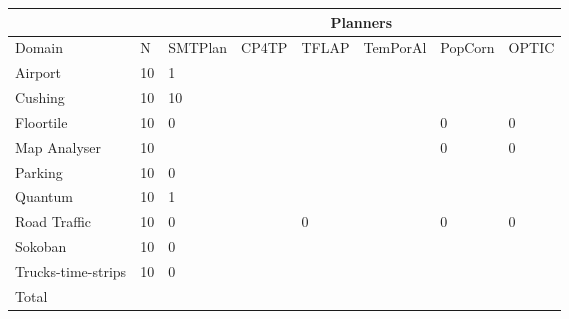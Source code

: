 \begin{table}[]
\begin{tabular}{|l|l|l|l|l|l|l|l|}
\hline
                   &    & \multicolumn{6}{c|}{Planners}                        \\ \hline
Domain             & N  & SMTPlan & CP4TP & TFLAP & TemPorAl & PopCorn & OPTIC \\ \hline
Airport            & 10 & 1       &       &       &          &         &       \\ \hline
Cushing            & 10 & 10      &       &       &          &         &       \\ \hline
Floortile          & 10 & 0       &       &       &          & 0       & 0     \\ \hline
Map Analyser       & 10 &         &       &       &          & 0       & 0     \\ \hline
Parking            & 10 & 0       &       &       &          &         &       \\ \hline
Quantum            & 10 & 1       &       &       &          &         &       \\ \hline
Road Traffic       & 10 & 0       &       & 0     &          & 0       & 0     \\ \hline
Sokoban            & 10 & 0       &       &       &          &         &       \\ \hline
Trucks-time-strips & 10 & 0       &       &       &          &         &       \\ \hline
Total              &    &         &       &       &          &         &       \\ \hline
\end{tabular}
\end{table}